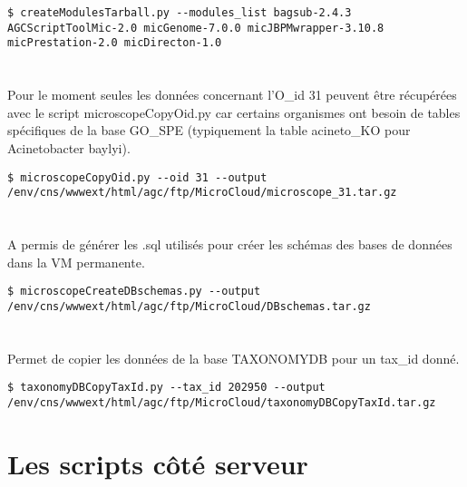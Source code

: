 \begin{lstlisting}[style=bash]
$ createModulesTarball.py --modules_list bagsub-2.4.3 AGCScriptToolMic-2.0 micGenome-7.0.0 micJBPMwrapper-3.10.8 micPrestation-2.0 micDirecton-1.0
\end{lstlisting}

\section{}

\begin{mycolorbox}
	Pour le moment seules les données concernant l'O\_id 31 peuvent être récupérées avec le script microscopeCopyOid.py car certains organismes ont besoin de tables spécifiques de la base GO\_SPE (typiquement la table acineto\_KO pour Acinetobacter baylyi).
\end{mycolorbox}

\begin{lstlisting}[style=bash]
$ microscopeCopyOid.py --oid 31 --output /env/cns/wwwext/html/agc/ftp/MicroCloud/microscope_31.tar.gz
\end{lstlisting}

\section{}
A permis de générer les .sql utilisés pour créer les schémas des bases de données dans la VM permanente.

\begin{lstlisting}[style=bash]
$ microscopeCreateDBschemas.py --output /env/cns/wwwext/html/agc/ftp/MicroCloud/DBschemas.tar.gz
\end{lstlisting}

\section{}
Permet de copier les données de la base TAXONOMYDB pour un tax\_id donné.

\begin{lstlisting}[style=bash]
$ taxonomyDBCopyTaxId.py --tax_id 202950 --output /env/cns/wwwext/html/agc/ftp/MicroCloud/taxonomyDBCopyTaxId.tar.gz
\end{lstlisting}

\section{Les scripts côté serveur}

